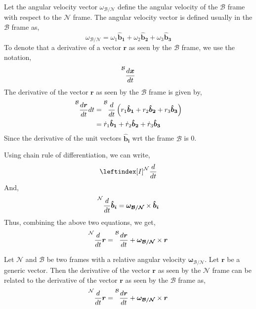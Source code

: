 Let the angular velocity vector \(\omega_{\mathcal{B} / \mathcal{N} }\) define the angular velocity of the \(\mathcal{B} \) frame with respect to the \(\mathcal{N} \) frame. The angular velocity vector is defined usually in the \(\mathcal{B} \) frame as,
\[
	\omega_{\mathcal{B} / \mathcal{N} } = \omega_{1}\bm{{\hat{b}_{1}}} + \omega_{2}\bm{{\hat{b}_{2}}} + \omega_{3}\bm{{\hat{b}_{3}}}
\]
To denote that a derivative of a vector \(\bm{r} \) as seen by the \(\mathcal{B} \) frame, we use the notation,
\[
	\prescript{\mathcal{B}}{}{\frac{d\bm{x}}{{dt}}}{}
\]
The derivative of the vector \(\bm{r} \) as seen by the \(\mathcal{B} \) frame is given by,
\[
	\begin{aligned}
		\prescript{\mathcal{B}}{}{\frac{d\bm{r}}{{dt}}}{dt} & = \prescript{\mathcal{B}}{}{\frac{d}{dt}\left(
			r_{1}\bm{{\hat{b}_{1}}} + r_{2}\bm{{\hat{b}_{2}}} + r_{3}\bm{{\hat{b}_{3}}}
			\right)}                                                                                                                                           \\
		                                                    & =\dot{r}_1 \bm{{\hat{b}_{1}}}  + \dot{r}_2 \bm{{\hat{b}_{2}}} + \dot{r}_3 \bm{{\hat{b}_{3}}}
	\end{aligned}
\]
Since the derivative of the unit vectors \(\bm{{\hat{b}_{i}}}\) wrt the frame \(\mathcal{B} \) is 0.

Using chain rule of differentiation, we can write,
\[
    \leftindex[I]^{\mathcal{N}} {\frac{d}{dt}}
\]
And,
\[
	\prescript{\mathcal{N}}{}{\frac{d}{dt}\bm{{\hat{b}_{i}}} } =  \bm{\omega_{\mathcal{B} / \mathcal{N} }} \times \bm{{\hat{b}_{i}}}
\]
Thus, combining the above two equations, we get,
\[
	\prescript{\mathcal{N}}{}{\frac{d}{dt} \bm{r} } = \prescript{\mathcal{B}}{}{\frac{d\bm{r}}{{dt}}}{} + \bm{\omega_{\mathcal{B} / \mathcal{N} }} \times \bm{r}
\]
\begin{theorem}
	Let \(\mathcal{N} \) and \(\mathcal{B} \) be two frames with a relative angular velocity \(\bm{\omega_{\mathcal{B} / \mathcal{N} }} \). Let \(\bm{r} \) be a generic vector. Then the derivative of the vector \(\bm{r} \) as seen by the \(\mathcal{N} \) frame can be related to the derivative of the vector \(\bm{r} \) as seen by the \(\mathcal{B} \) frame as,
	\[
		\prescript{\mathcal{N}}{}{\frac{d}{dt} \bm{r} } = \prescript{\mathcal{B}}{}{\frac{d\bm{r}}{{dt}}}{} + \bm{\omega_{\mathcal{B} / \mathcal{N} }} \times \bm{r}
	\]
\end{theorem}

